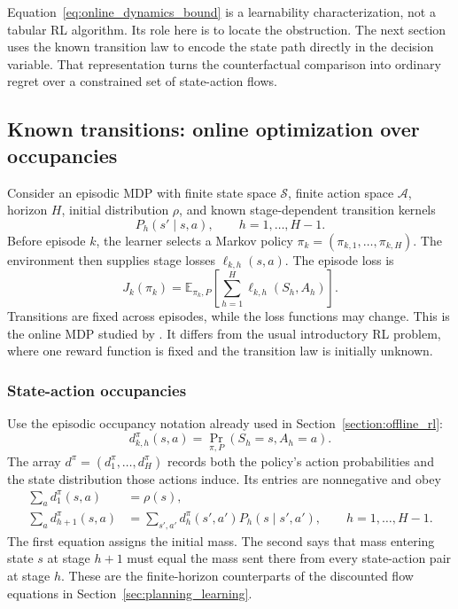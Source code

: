 Equation~\eqref{eq:online_dynamics_bound} is a learnability characterization, not a tabular RL algorithm. Its role here is to locate the obstruction. The next section uses the known transition law to encode the state path directly in the decision variable. That representation turns the counterfactual comparison into ordinary regret over a constrained set of state-action flows.

\subsection{Known transitions: online optimization over occupancies}
\label{sec:online_known_transitions}

Consider an episodic MDP with finite state space $\mathcal S$, finite action space $\mathcal A$, horizon $H$, initial distribution $\rho$, and known stage-dependent transition kernels
\[
P_h(s'\mid s,a),
\qquad h=1,\ldots,H-1.
\]
Before episode $k$, the learner selects a Markov policy $\pi_k=(\pi_{k,1},\ldots,\pi_{k,H})$. The environment then supplies stage losses $\ell_{k,h}(s,a)$. The episode loss is
\begin{equation}
J_k(\pi_k)
=
\mathbb E_{\pi_k,P}
\left[
\sum_{h=1}^H\ell_{k,h}(S_h,A_h)
\right].
\label{eq:online_mdp_episode_loss}
\end{equation}
Transitions are fixed across episodes, while the loss functions may change. This is the online MDP studied by \citet{ziminNeu2013}. It differs from the usual introductory RL problem, where one reward function is fixed and the transition law is initially unknown.

\subsubsection{State-action occupancies}

Use the episodic occupancy notation already used in Section~\ref{section:offline_rl}:
\begin{equation}
d_{k,h}^{\pi}(s,a)
=
\Pr_{\pi,P}(S_h=s,A_h=a).
\label{eq:online_episodic_occupancy}
\end{equation}
The array $d^\pi=(d_1^\pi,\ldots,d_H^\pi)$ records both the policy's action probabilities and the state distribution those actions induce. Its entries are nonnegative and obey
\begin{align}
\sum_a d_1^\pi(s,a)
&=
\rho(s),
\label{eq:online_flow_initial}\\
\sum_a d_{h+1}^\pi(s,a)
&=
\sum_{s',a'}
d_h^\pi(s',a')P_h(s\mid s',a'),
\qquad h=1,\ldots,H-1.
\label{eq:online_flow_transition}
\end{align}
The first equation assigns the initial mass. The second says that mass entering state $s$ at stage $h+1$ must equal the mass sent there from every state-action pair at stage $h$. These are the finite-horizon counterparts of the discounted flow equations in Section~\ref{sec:planning_learning}.


